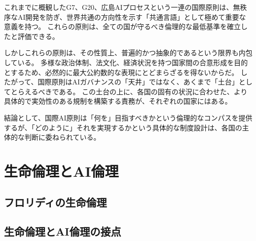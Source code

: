 これまでに概観したG7、G20、広島AIプロセスという一連の国際原則は、無秩序なAI開発を防ぎ、世界共通の方向性を示す「共通言語」として極めて重要な意義を持つ。
これらの原則は、全ての国が守るべき倫理的な最低基準を確立したと評価できる。

しかしこれらの原則は、その性質上、普遍的かつ抽象的であるという限界も内包している。
多様な政治体制、法文化、経済状況を持つ国家間の合意形成を目的とするため、必然的に最大公約数的な表現にとどまらざるを得ないからだ。
したがって、国際原則はAIガバナンスの「天井」ではなく、あくまで「土台」としてとらえるべきである。
この土台の上に、各国の固有の状況に合わせた、より具体的で実効性のある規制を構築する責務が、それぞれの国家にはある。

結論として、国際AI原則は「何を」目指すべきかという倫理的なコンパスを提供するが、「どのように」それを実現するかという具体的な制度設計は、各国の主体的な判断に委ねられている。



\section{生命倫理とAI倫理} %

\subsection{フロリディの生命倫理}

\subsection{生命倫理とAI倫理の接点}




